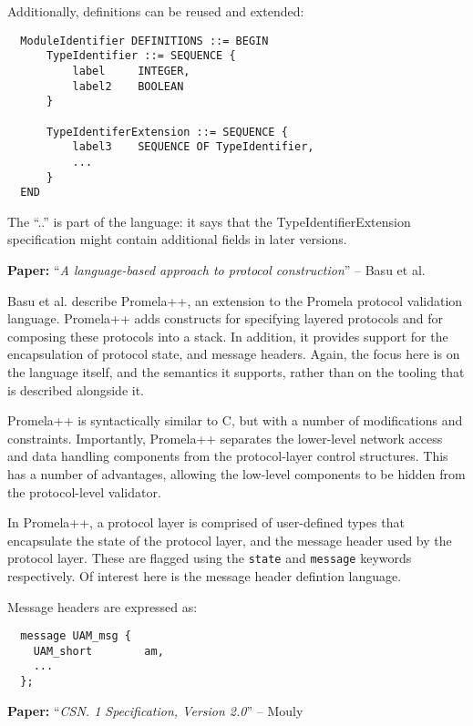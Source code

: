 \documentclass[10pt,a4paper]{article}
\newcommand{\paper}[3]{\vspace{4mm}\noindent\textbf{Paper:} ``\textit{#1}'' -- #2 \cite{#3}\vspace{3mm}}
\begin{document}
Additionally, definitions can be reused and extended:

\begin{verbatim}
  ModuleIdentifier DEFINITIONS ::= BEGIN
      TypeIdentifier ::= SEQUENCE {
          label     INTEGER,
          label2    BOOLEAN
      }
    
      TypeIdentiferExtension ::= SEQUENCE {
          label3    SEQUENCE OF TypeIdentifier,
          ...
      }
  END
\end{verbatim}

The ``..'' is part of the language: it says that the TypeIdentifierExtension specification
might contain additional fields in later versions.

\paper{A language-based approach to protocol construction}{Basu et al.}{basu1997language}

Basu et al. describe Promela++, an extension to the Promela protocol validation language.
Promela++ adds constructs for specifying layered protocols and for composing these
protocols into a stack. In addition, it provides support for the encapsulation of
protocol state, and message headers. Again, the focus here is on the language itself, and
the semantics it supports, rather than on the tooling that is described alongside it.

Promela++ is syntactically similar to C, but with a number of modifications and
constraints. Importantly, Promela++ separates the lower-level network access and data
handling components from the protocol-layer control structures. This has a number of
advantages, allowing the low-level components to be hidden from the protocol-level
validator.

In Promela++, a protocol layer is comprised of user-defined types that encapsulate the
state of the protocol layer, and the message header used by the protocol layer. These
are flagged using the \texttt{state} and \texttt{message} keywords respectively. Of 
interest here is the message header defintion language.

Message headers are expressed as:

\begin{verbatim}
  message UAM_msg {
    UAM_short        am,
    ...
  };
\end{verbatim}

\paper{CSN. 1 Specification, Version 2.0}{Mouly}{mouly1998csn}
\end{document}
